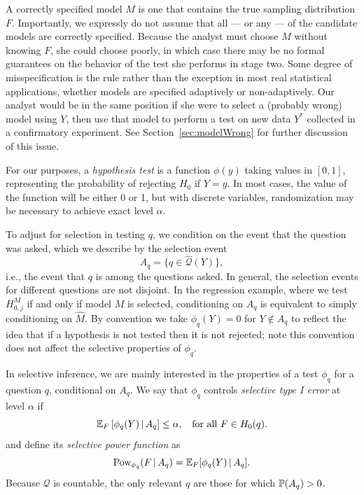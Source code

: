 \documentclass{article}
\theoremstyle{definition}
\newcommand{\cQ}{\mathcal{Q}}
\newcommand{\hcQ}{\widehat{\mathcal{Q}}}
\newcommand{\pow}{\text{Pow}}
\newcommand{\hM}{\widehat{M}}
\begin{document}
A correctly specified model $M$ is one that contains the true sampling distribution $F$. Importantly, we expressly do not assume that all --- or any --- of the candidate models are correctly specified. Because the analyst must choose $M$ without knowing $F$, she could choose poorly, in which case there may be no formal guarantees on the behavior of the test she performs in stage two. Some degree of misspecification is the rule rather than the exception in most real statistical applications, whether models are specified adaptively or non-adaptively. Our analyst would be in the same position if she were to select a (probably wrong) model using $Y$, then use that model to perform a test on new data $Y^*$ collected in a confirmatory experiment. See Section~\ref{sec:modelWrong} for further discussion of this issue.

For our purposes, a {\em hypothesis test} is a function $\phi(y)$ taking values in $[0, 1]$, representing the probability of rejecting $H_0$ if $Y=y$. In most cases, the value of the function will be either 0 or 1, but with discrete variables, randomization may be necessary to achieve exact level $\alpha$.

To adjust for selection in testing $q$, we condition on the event that the question was asked, which we describe by the selection event
\begin{equation}
A_q = \{q \in \hcQ(Y) \},
\label{eq:A_q}
\end{equation}
i.e., the event that $q$ is among the questions asked. In general, the selection events for different questions are not disjoint. In the regression example, where we test $H^M_{0, j}$ if and only if model $M$ is selected, conditioning on $A_q$ is equivalent to simply conditioning on $\hM$. By convention we take $\phi_q(Y) = 0$ for $Y\notin A_q$ to reflect the idea that if a hypothesis is not tested then it is not rejected; note this convention does not affect the selective properties of $\phi_q$.

In selective inference, we are mainly interested in the properties of a test $\phi_q$ for a question $q$, conditional on $A_q$. We say that $\phi_q$ controls {\em selective type I error} at level $\alpha$ if
\begin{equation}\label{eq:selT1}
\E_F\left[\phi_q(Y) \gv A_q\right] \leq \alpha, \;\; \text{ for all } F\in H_0(q).
\end{equation}
and define its {\em selective power function} as
\begin{equation}\label{eq:selPow}
  \pow_{\phi_q}(F \gv A_q) = \E_{F}[\phi_q(Y) \gv A_q].
\end{equation}
Because $\cQ$ is countable, the only relevant $q$ are those for which $\P(A_q) > 0$.
\end{document}

